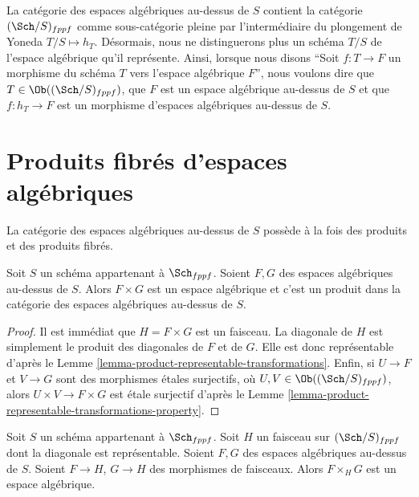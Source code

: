 \noindent
La catégorie des espaces algébriques au-dessus de $S$ contient la catégorie
$(\Sch/S)_{fppf}$ comme sous-catégorie pleine par l'intermédiaire du
plongement de Yoneda $T/S \mapsto h_T$. Désormais, nous ne distinguerons plus
un schéma $T/S$ de l'espace algébrique qu'il représente.
Ainsi, lorsque nous disons ``Soit $f : T \to F$ un morphisme du schéma
$T$ vers l'espace algébrique $F$'', nous voulons dire que
$T \in \Ob((\Sch/S)_{fppf})$, que $F$ est un
espace algébrique au-dessus de $S$ et que $f : h_T \to F$ est un morphisme
d'espaces algébriques au-dessus de $S$.






\section{Produits fibrés d'espaces algébriques}
\label{section-fibre-products}

\noindent
La catégorie des espaces algébriques au-dessus de $S$ possède à la fois des produits et des
produits fibrés.

\begin{lemma}
\label{lemma-product-spaces}
Soit $S$ un schéma appartenant à $\Sch_{fppf}$.
Soient $F, G$ des espaces algébriques au-dessus de $S$.
Alors $F \times G$ est un espace algébrique et c'est un produit
dans la catégorie des espaces algébriques au-dessus de $S$.
\end{lemma}

\begin{proof}
Il est immédiat que $H = F \times G$ est un faisceau.
La diagonale de $H$ est simplement le produit des
diagonales de $F$ et de $G$. Elle est donc représentable d'après le
Lemme \ref{lemma-product-representable-transformations}.
Enfin, si $U \to F$ et $V \to G$ sont des morphismes étales
surjectifs, où $U, V \in \Ob((\Sch/S)_{fppf})$,
alors $U \times V \to F \times G$ est étale surjectif
d'après le Lemme \ref{lemma-product-representable-transformations-property}.
\end{proof}

\begin{lemma}
\label{lemma-fibre-product-spaces-over-sheaf-with-representable-diagonal}
Soit $S$ un schéma appartenant à $\Sch_{fppf}$.
Soit $H$ un faisceau sur $(\Sch/S)_{fppf}$ dont la diagonale
est représentable. Soient $F, G$ des espaces algébriques au-dessus de $S$.
Soient $F \to H$, $G \to H$ des morphismes de faisceaux.
Alors $F \times_H G$ est un espace algébrique.
\end{lemma}

